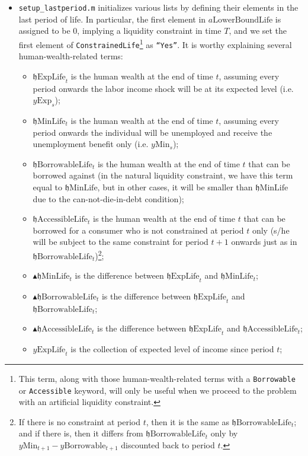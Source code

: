 \documentclass[titlepage,abstract]{\econtex}
\providecommand{\hEndExpLife}{\mathfrak{h}\text{ExpLife}}
\providecommand{\hEndMinLife}{\mathfrak{h}\text{MinLife}}
\providecommand{\hEndBorrowableLife}{\mathfrak{h}\text{BorrowableLife}}
\providecommand{\hEndAccessibleLife}{\mathfrak{h}\text{AccessibleLife}}
\providecommand{\DeltahEndMinLife}{\blacktriangle \mathfrak{h}\text{MinLife}}
\providecommand{\DeltahEndBorrowableLife}{\blacktriangle \mathfrak{h}\text{BorrowableLife}}
\providecommand{\DeltahEndAccessibleLife}{\blacktriangle \mathfrak{h}\text{AccessibleLife}}
\providecommand{\yExpLife}{y\text{ExpLife}}
\providecommand{\yMin}{y\text{Min}}
\providecommand{\yBorrowable}{y\text{Borrowable}}
\providecommand{\yExp}{y\text{Exp}}
\begin{document}
\begin{itemize}
      \item \texttt{setup\_lastperiod.m} initializes various lists by defining their elements in the last period of life. In particular, the first element in $a\text{LowerBoundLife}$ is assigned to be 0, implying a liquidity constraint in time $T$, and we set the first element of \texttt{ConstrainedLife}\footnote{This term, along with those human-wealth-related terms with a \texttt{Borrowable} or \texttt{Accessible} keyword, will only be useful when we proceed to the problem with an artificial liquidity constraint.} as \texttt{``Yes''}. It is worthy explaining several human-wealth-related terms:
          \begin{itemize}
          \item $\hEndExpLife_{t}$ is the human wealth at the end of time $t$, assuming every period onwards the labor income shock will be at its expected level (i.e. $\yExp_{s}$);
          \item $\hEndMinLife_{t}$ is the human wealth at the end of time $t$, assuming every period onwards the individual will be unemployed and receive the unemployment benefit only (i.e. $\yMin_{s}$);
          \item $\hEndBorrowableLife_{t}$ is the human wealth at the end of time $t$ that can be borrowed against (in the natural liquidity constraint, we have this term equal to $\hEndMinLife$, but in other cases, it will be smaller than $\hEndMinLife$ due to the can-not-die-in-debt condition);   
          \item $\hEndAccessibleLife_{t}$ is the human wealth at the end of time $t$ that can be borrowed for a consumer who is not constrained at period $t$ only (s/he will be subject to the same constraint for period $t+1$ onwards just as in $\hEndBorrowableLife_{t}$)\footnote{If there is no constraint at period $t$, then it is the same as $\hEndBorrowableLife_{t}$; and if there is, then it differs from $\hEndBorrowableLife_{t}$ only by $\yMin_{t+1}-\yBorrowable_{t+1}$ discounted back to period $t$.};
          \item $\DeltahEndMinLife_{t}$ is the difference between $\hEndExpLife_{t}$ and $\hEndMinLife_{t}$;
           \item $\DeltahEndBorrowableLife_{t}$ is the difference between $\hEndExpLife_{t}$ and $\hEndBorrowableLife_{t}$;
           \item $\DeltahEndAccessibleLife_{t}$ is the difference between $\hEndExpLife_{t}$ and $\hEndAccessibleLife_{t}$;
           \item $\yExpLife_{t}$ is the collection of expected level of income since period $t$;

\end{itemize}
\end{itemize}
\end{document}
